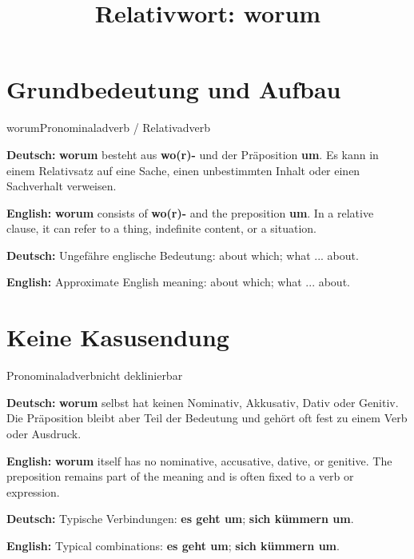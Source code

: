 \documentclass[a4paper,11pt]{article}
\title{Relativwort: \glqq worum\grqq{}}
\date{}
\newcommand{\GermanText}[1]{\textbf{Deutsch: }#1\par}
\newcommand{\EnglishText}[1]{{\small\color{SoftGray}\textbf{English: }#1\par}}
\begin{document}
\maketitle

\tableofcontents

\newpage

\section{Grundbedeutung und Aufbau}

\begin{grammarentry}{worum}{Pronominaladverb / Relativadverb}

\GermanText{\textbf{worum} besteht aus \textbf{wo(r)-} und der Präposition \textbf{um}. Es kann in einem Relativsatz auf eine Sache, einen unbestimmten Inhalt oder einen Sachverhalt verweisen.}

\EnglishText{\textbf{worum} consists of \textbf{wo(r)-} and the preposition \textbf{um}. In a relative clause, it can refer to a thing, indefinite content, or a situation.}

\GermanText{Ungefähre englische Bedeutung: \glqq about which; what ... about\grqq{}.}

\EnglishText{Approximate English meaning: \glqq about which; what ... about\grqq{}.}

\end{grammarentry}

\section{Keine Kasusendung}

\begin{grammarentry}{Pronominaladverb}{nicht deklinierbar}

\GermanText{\textbf{worum} selbst hat keinen Nominativ, Akkusativ, Dativ oder Genitiv. Die Präposition bleibt aber Teil der Bedeutung und gehört oft fest zu einem Verb oder Ausdruck.}

\EnglishText{\textbf{worum} itself has no nominative, accusative, dative, or genitive. The preposition remains part of the meaning and is often fixed to a verb or expression.}

\GermanText{Typische Verbindungen: \textbf{es geht um}; \textbf{sich kümmern um}.}

\EnglishText{Typical combinations: \textbf{es geht um}; \textbf{sich kümmern um}.}

\end{grammarentry}
\end{document}
